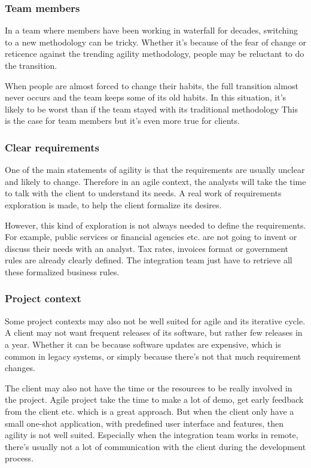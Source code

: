 \subsubsection{Team members}
In a team where members have been working in waterfall for decades, switching
to a new methodology can be tricky.
Whether it's because of the fear of change or reticence against the
trending agility methodology, people may be reluctant to do the transition.

When people are almost forced to change their habits, the full transition
almost never occurs and the team keeps some of its old habits.
In this situation, it's likely to be worst than if the team stayed with its
traditional methodology
This is the case for team members but it's even more true for clients.

\subsubsection{Clear requirements}
One of the main statements of agility is that the requirements are usually
unclear and likely to change.
Therefore in an agile context, the analysts will take the time to talk with
the client to understand its needs.
A real work of requirements exploration is made, to help the client
formalize its desires.

However, this kind of exploration is not always needed to define the
requirements.
For example, public services or financial agencies etc.
are not going to invent or discuss their needs with an analyst.
Tax rates, invoices format or government rules are already clearly defined.
The integration team just have to retrieve all these formalized business rules.

\subsubsection{Project context}
Some project contexts may also not be well suited for agile and its iterative
cycle.
A client may not want frequent releases of its software, but rather few
releases in a year.
Whether it can be because software updates are expensive, which is common in
legacy systems, or simply because there's not that much requirement changes.

The client may also not have the time or the resources to be really involved
in the project.
Agile project take the time to make a lot of demo, get early feedback from
the client etc.
which is a great approach.
But when the client only have a small one-shot application, with predefined
user interface and features, then agility is not well suited.
Especially when the integration team works in remote, there's usually not a
lot of communication with the client during the development process.

